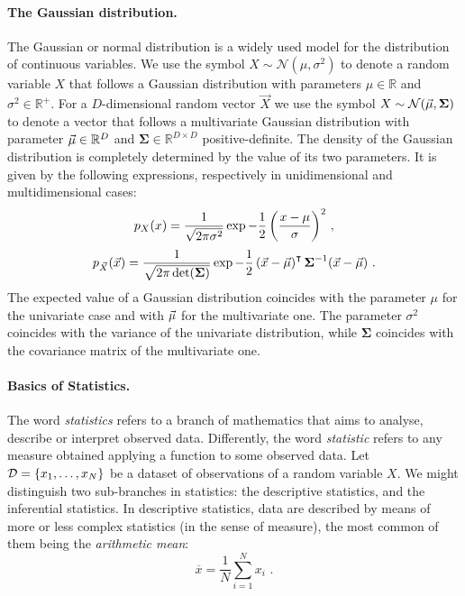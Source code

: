 \paragraph*{The Gaussian distribution.}
The Gaussian or normal distribution is a widely used model for the distribution of continuous variables. We use the symbol $X\sim\mathcal{N}(\mu,\sigma^2)$ to denote a random variable $X$ that follows a Gaussian distribution with parameters $\mu\in\mathbb{R}$ and $\sigma^2\in\mathbb{R}^{+}$. For a $D$-dimensional random vector $\vec{X}$ we use the symbol $X\sim\mathcal{N}(\vec{\mu},\boldsymbol{\Sigma})$ to denote a vector that follows a multivariate Gaussian distribution with parameter $\vec{\mu}\in\mathbb{R}^D$ and $\boldsymbol{\Sigma}\in\mathbb{R}^{D\times D}$ positive-definite. The density of the Gaussian distribution is completely determined by the value of its two parameters. It is given by the following expressions, respectively in unidimensional and multidimensional cases: 
\begin{equation}
p_X(x) = \frac{1}{\sqrt{2\pi\sigma^2}}\exp{-\frac{1}{2}\left(\frac{x-\mu}{\sigma}\right)^2}\mbox{ ,}
\end{equation}
\begin{equation}
p_{\vec{X}}(\vec{x}) = \frac{1}{\sqrt{2\pi\det(\boldsymbol{\Sigma})}}\exp{-\frac{1}{2}\left(\vec{x}-\vec{\mu}\right)^\intercal \boldsymbol{\Sigma}^ {-1}(\vec{x}-\vec{\mu})} \mbox{ .}
\end{equation}
The expected value of a Gaussian distribution coincides with the parameter $\mu$ for the univariate case and with $\vec{\mu}$ for the multivariate one. The parameter $\sigma^2$ coincides with the variance of the univariate distribution, while $\boldsymbol{\Sigma}$ coincides with the covariance matrix of the multivariate one.

\paragraph*{Basics of Statistics.}
The word \emph{statistics}  refers to a branch of mathematics that aims to analyse, describe or interpret observed data. Differently, the word \emph{statistic} refers to any measure obtained applying a function to some observed data. Let $\mathcal{D} = \{x_1,\dots,x_N\}$ be a dataset of observations of a random variable $X$. We might distinguish two sub-branches in statistics: the descriptive statistics, and the inferential statistics. In descriptive statistics, data are described by means of more or less complex statistics (in the sense of measure), the most common of them being the \emph{arithmetic mean}: 
\begin{equation}
\overline{x} = \frac{1}{N}\sum_{i=1}^N x_i \mbox{ .}
\end{equation}

